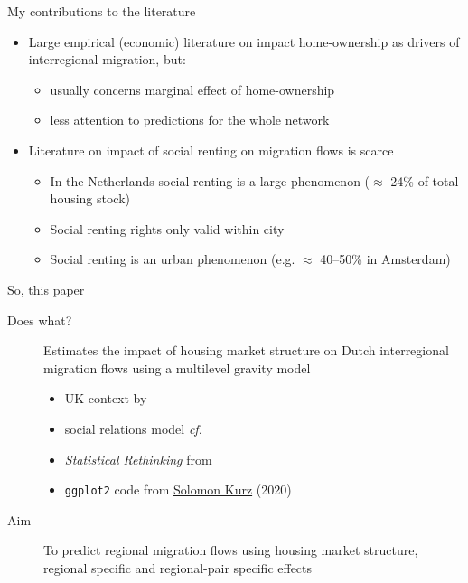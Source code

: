 \documentclass{beamer}
\begin{document}
\begin{frame}{My contributions to the literature}
  \begin{itemize}
  \item Large empirical (economic) literature on impact home-ownership as drivers of interregional migration, but:
    \begin{itemize}
    \item usually concerns \alert{marginal} effect of home-ownership
    \item less attention to \alert{predictions} for the whole network\newline
    \end{itemize}
  \item Literature on impact of social renting on migration flows is
    scarce \footnotesize{\citep{de2009homeownership} }
	\begin{itemize}
        \item In the Netherlands social renting is a large phenomenon
          ($\approx$ 24\% of total housing stock)
        \item Social renting rights only valid \alert{within} city
        \item Social renting is an \alert{urban} phenomenon (e.g. $\approx$
          40--50\% in Amsterdam) 
        \end{itemize}
\end{itemize}
\end{frame}

\begin{frame}{So, this paper}
  \begin{description}
  \item[Does what?] \alert{Estimates} the impact of housing market
	  structure on Dutch interregional migration flows using a
	  \alert{multilevel} gravity model
    \begin{footnotesize}
	\begin{itemize}
	  \item \footnotesize UK context by \citet{congdon2010random}
	  \item \footnotesize social relations model \emph{cf.}
		\citet{koster2014food}
		\item \footnotesize \emph{Statistical Rethinking} from \citet{mcelreath2020statistical}
		\item \footnotesize \texttt{ggplot2} code from \href{https://bookdown.org/content/4857/}{Solomon Kurz} (2020) \newline
	\end{itemize}
  \end{footnotesize}
	\item[Aim] To \alert{predict} regional migration flows using housing market structure, regional specific and regional-pair specific effects
  \end{description}
\end{frame}
\end{document}
